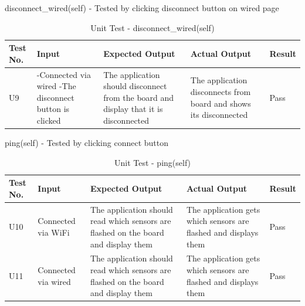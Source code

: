 \documentclass[12pt, titlepage]{article}
\begin{document}
  disconnect\_wired(self) - Tested by clicking disconnect button on wired page
  \begin{table}[H]
    \begin{tabular}{| p{} | p{}| p{}| p{}| p{}|}
      \hline
      \rowcolor[gray]{0.9}
      Test No. & Input & Expected Output & Actual Output & Result\\
      \hline
      U9 & -Connected via wired -The disconnect button is clicked & The application should disconnect from the board and display that it is disconnected & The application disconnects from board and shows its disconnected & Pass \\
      \hline
    \end{tabular}
    \caption{Unit Test - disconnect\_wired(self)}
    \end{table}
\newpage

  ping(self) - Tested by clicking connect button
  \begin{table}[H]
    \begin{tabular}{| p{} | p{}| p{}| p{}| p{}|}
      \hline
      \rowcolor[gray]{0.9}
      Test No. & Input & Expected Output & Actual Output & Result\\
      \hline
      U10 & Connected via WiFi & The application should read which sensors are flashed on the board and display them & The application gets which sensors are flashed and displays them & Pass \\
      \hline
      U11 & Connected via wired & The application should read which sensors are flashed on the board and display them & The application gets which sensors are flashed and displays them & Pass \\
      \hline
    \end{tabular}
    \caption{Unit Test - ping(self)}
    \end{table}
\end{document}
